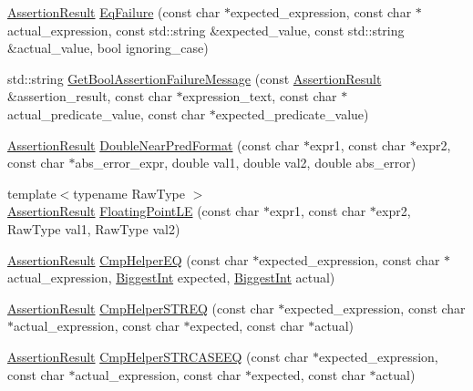 \begin{DoxyCompactItemize}
\item 
\hyperlink{classtesting_1_1_assertion_result}{Assertion\-Result} \hyperlink{namespacetesting_1_1internal_a08725846ff184d3e79bcf5be4df19157}{Eq\-Failure} (const char $\ast$expected\-\_\-expression, const char $\ast$actual\-\_\-expression, const std\-::string \&expected\-\_\-value, const std\-::string \&actual\-\_\-value, bool ignoring\-\_\-case)
\item 
std\-::string \hyperlink{namespacetesting_1_1internal_a5fd6e5dc9eb20ab3c3a80e24d89dfac6}{Get\-Bool\-Assertion\-Failure\-Message} (const \hyperlink{classtesting_1_1_assertion_result}{Assertion\-Result} \&assertion\-\_\-result, const char $\ast$expression\-\_\-text, const char $\ast$actual\-\_\-predicate\-\_\-value, const char $\ast$expected\-\_\-predicate\-\_\-value)
\item 
\hyperlink{classtesting_1_1_assertion_result}{Assertion\-Result} \hyperlink{namespacetesting_1_1internal_a4f70b36c624b54c2362aeecc2f05ee8c}{Double\-Near\-Pred\-Format} (const char $\ast$expr1, const char $\ast$expr2, const char $\ast$abs\-\_\-error\-\_\-expr, double val1, double val2, double abs\-\_\-error)
\item 
{\footnotesize template$<$typename Raw\-Type $>$ }\\\hyperlink{classtesting_1_1_assertion_result}{Assertion\-Result} \hyperlink{namespacetesting_1_1internal_a17b52b6b1f81f6dcad5cc4d12e5173a6}{Floating\-Point\-L\-E} (const char $\ast$expr1, const char $\ast$expr2, Raw\-Type val1, Raw\-Type val2)
\item 
\hyperlink{classtesting_1_1_assertion_result}{Assertion\-Result} \hyperlink{namespacetesting_1_1internal_ae82c79cea2973bbbfbd0f2aca7a6f349}{Cmp\-Helper\-E\-Q} (const char $\ast$expected\-\_\-expression, const char $\ast$actual\-\_\-expression, \hyperlink{namespacetesting_1_1internal_a05c6bd9ede5ccdf25191a590d610dcc6}{Biggest\-Int} expected, \hyperlink{namespacetesting_1_1internal_a05c6bd9ede5ccdf25191a590d610dcc6}{Biggest\-Int} actual)
\item 
\hyperlink{classtesting_1_1_assertion_result}{Assertion\-Result} \hyperlink{namespacetesting_1_1internal_a11ff4bc46dddd8bb07c0e247a603695d}{Cmp\-Helper\-S\-T\-R\-E\-Q} (const char $\ast$expected\-\_\-expression, const char $\ast$actual\-\_\-expression, const char $\ast$expected, const char $\ast$actual)
\item 
\hyperlink{classtesting_1_1_assertion_result}{Assertion\-Result} \hyperlink{namespacetesting_1_1internal_a802d9586d870a90e6a850953c167654d}{Cmp\-Helper\-S\-T\-R\-C\-A\-S\-E\-E\-Q} (const char $\ast$expected\-\_\-expression, const char $\ast$actual\-\_\-expression, const char $\ast$expected, const char $\ast$actual)

\end{DoxyCompactItemize}
